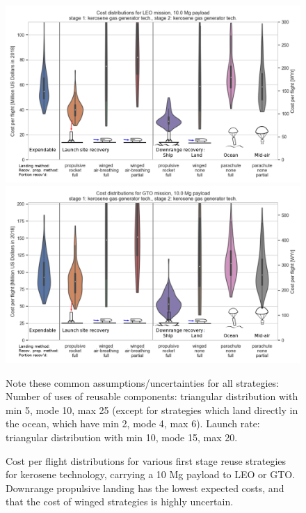 \documentclass{iaf-iac}
\begin{document}
\begin{multicols}{2}
\begin{figure}
    \centering
    \includegraphics[width=\textwidth]{strategy_cost_annotated/LEO_kero}
     \includegraphics[width=\textwidth]{strategy_cost_annotated/GTO_kero}
    \caption{\label{fig:strategy_cost_kerosene} Cost per flight distributions for various first stage reuse strategies for kerosene technology, carrying a 10 Mg payload to LEO or GTO. Downrange propulsive landing has the lowest expected costs, and that the cost of winged strategies is highly uncertain.}
    \small Note these common assumptions/uncertainties for all strategies: Number of uses of reusable components: triangular distribution with min 5, mode 10, max 25 (except for strategies which land directly in the ocean, which have min 2, mode 4, max 6). Launch rate: triangular distribution with min 10, mode 15, max 20.
\end{figure}


\end{multicols}
\end{document}
